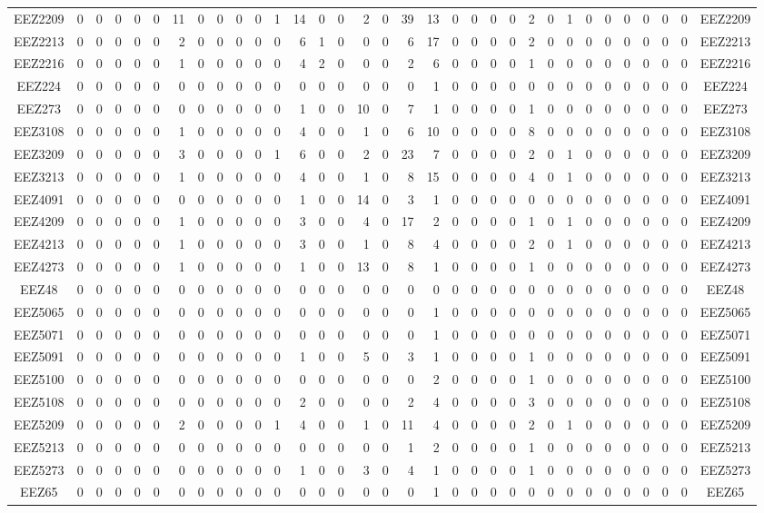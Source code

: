 \documentclass[10pt,a4paper,twoside]{report}
\begin{document}
{\begin{tabular}{crrrrrrrrrrrrrrrrrrrrrrrrrrrrrrrc}
EEZ2209&0&0&0&0&0&11&0&0&0&0&1&14&0&0&2&0&39&13&0&0&0&0&2&0&1&0&0&0&0&0&0&EEZ2209\\
EEZ2213&0&0&0&0&0&2&0&0&0&0&0&6&1&0&0&0&6&17&0&0&0&0&2&0&0&0&0&0&0&0&0&EEZ2213\\
EEZ2216&0&0&0&0&0&1&0&0&0&0&0&4&2&0&0&0&2&6&0&0&0&0&1&0&0&0&0&0&0&0&0&EEZ2216\\
EEZ224&0&0&0&0&0&0&0&0&0&0&0&0&0&0&0&0&0&1&0&0&0&0&0&0&0&0&0&0&0&0&0&EEZ224\\
EEZ273&0&0&0&0&0&0&0&0&0&0&0&1&0&0&10&0&7&1&0&0&0&0&1&0&0&0&0&0&0&0&0&EEZ273\\
EEZ3108&0&0&0&0&0&1&0&0&0&0&0&4&0&0&1&0&6&10&0&0&0&0&8&0&0&0&0&0&0&0&0&EEZ3108\\
EEZ3209&0&0&0&0&0&3&0&0&0&0&1&6&0&0&2&0&23&7&0&0&0&0&2&0&1&0&0&0&0&0&0&EEZ3209\\
EEZ3213&0&0&0&0&0&1&0&0&0&0&0&4&0&0&1&0&8&15&0&0&0&0&4&0&1&0&0&0&0&0&0&EEZ3213\\
EEZ4091&0&0&0&0&0&0&0&0&0&0&0&1&0&0&14&0&3&1&0&0&0&0&0&0&0&0&0&0&0&0&0&EEZ4091\\
EEZ4209&0&0&0&0&0&1&0&0&0&0&0&3&0&0&4&0&17&2&0&0&0&0&1&0&1&0&0&0&0&0&0&EEZ4209\\
EEZ4213&0&0&0&0&0&1&0&0&0&0&0&3&0&0&1&0&8&4&0&0&0&0&2&0&1&0&0&0&0&0&0&EEZ4213\\
EEZ4273&0&0&0&0&0&1&0&0&0&0&0&1&0&0&13&0&8&1&0&0&0&0&1&0&0&0&0&0&0&0&0&EEZ4273\\
EEZ48&0&0&0&0&0&0&0&0&0&0&0&0&0&0&0&0&0&0&0&0&0&0&0&0&0&0&0&0&0&0&0&EEZ48\\
EEZ5065&0&0&0&0&0&0&0&0&0&0&0&0&0&0&0&0&0&1&0&0&0&0&0&0&0&0&0&0&0&0&0&EEZ5065\\
EEZ5071&0&0&0&0&0&0&0&0&0&0&0&0&0&0&0&0&0&1&0&0&0&0&0&0&0&0&0&0&0&0&0&EEZ5071\\
EEZ5091&0&0&0&0&0&0&0&0&0&0&0&1&0&0&5&0&3&1&0&0&0&0&1&0&0&0&0&0&0&0&0&EEZ5091\\
EEZ5100&0&0&0&0&0&0&0&0&0&0&0&0&0&0&0&0&0&2&0&0&0&0&1&0&0&0&0&0&0&0&0&EEZ5100\\
EEZ5108&0&0&0&0&0&0&0&0&0&0&0&2&0&0&0&0&2&4&0&0&0&0&3&0&0&0&0&0&0&0&0&EEZ5108\\
EEZ5209&0&0&0&0&0&2&0&0&0&0&1&4&0&0&1&0&11&4&0&0&0&0&2&0&1&0&0&0&0&0&0&EEZ5209\\
EEZ5213&0&0&0&0&0&0&0&0&0&0&0&0&0&0&0&0&1&2&0&0&0&0&1&0&0&0&0&0&0&0&0&EEZ5213\\
EEZ5273&0&0&0&0&0&0&0&0&0&0&0&1&0&0&3&0&4&1&0&0&0&0&1&0&0&0&0&0&0&0&0&EEZ5273\\
EEZ65&0&0&0&0&0&0&0&0&0&0&0&0&0&0&0&0&0&1&0&0&0&0&0&0&0&0&0&0&0&0&0&EEZ65\\

\end{tabular}}
\end{document}

